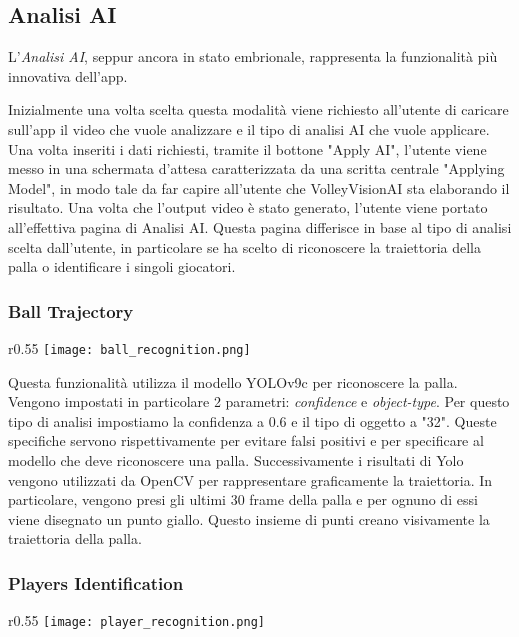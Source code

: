 \subsection{Analisi AI}
\label{subsec:funzionalita_ai}

L'\textit{Analisi AI}, seppur ancora in stato embrionale, rappresenta la funzionalità più innovativa dell'app. 

Inizialmente una volta scelta questa modalità viene richiesto all'utente di caricare sull'app il video che vuole analizzare e il tipo di analisi AI che vuole applicare.
Una volta inseriti i dati richiesti, tramite il bottone "Apply AI", l'utente viene messo in una schermata d'attesa caratterizzata da una scritta centrale  "Applying Model", in modo tale da far capire all'utente che VolleyVisionAI sta elaborando il risultato.
Una volta che l'output video è stato generato, l'utente viene portato all'effettiva pagina di Analisi AI.
Questa pagina differisce in base al tipo di analisi scelta dall'utente, in particolare se ha scelto di riconoscere la traiettoria della palla o identificare i singoli giocatori.

\subsubsection{Ball Trajectory}
\begin{wrapfigure}{r}{0.55\textwidth}
    \centering
    \vspace{-0.4cm}
    \texttt{[image: ball\_recognition.png]}
    \label{fig:ball_trajectory}
\end{wrapfigure}

Questa funzionalità utilizza il modello YOLOv9c per riconoscere la palla. Vengono impostati in particolare 2 parametri: \textit{confidence} e \textit{object-type}. Per questo tipo di analisi impostiamo la confidenza a 0.6 e il tipo di oggetto a "32". Queste specifiche servono rispettivamente per evitare falsi positivi e per specificare al modello che deve riconoscere una palla. Successivamente i risultati di Yolo vengono utilizzati da OpenCV per rappresentare graficamente la traiettoria. In particolare, vengono presi gli ultimi 30 frame della palla e per ognuno di essi viene disegnato un punto giallo. Questo insieme di punti creano visivamente la traiettoria della palla.

\subsubsection{Players Identification}
\begin{wrapfigure}{r}{0.55\textwidth}
    \centering
    \vspace{-0.5cm}
    \texttt{[image: player\_recognition.png]}
    \label{fig:player_identification}
\end{wrapfigure}

